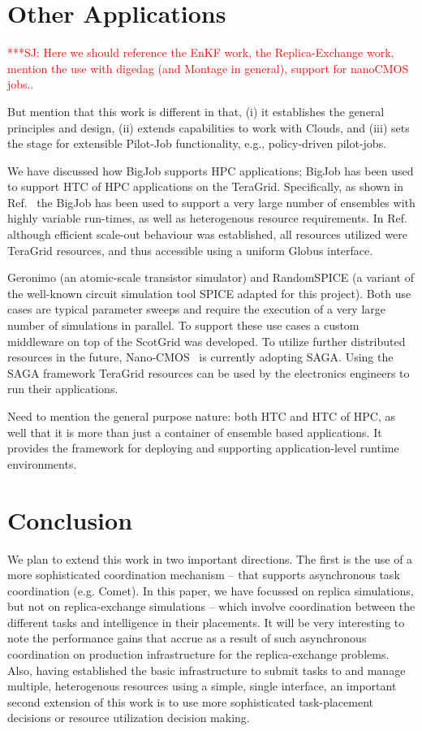 \documentclass[conference,final]{IEEEtran}
\newcommand{\jhanote}[1]{ {\textcolor{red} { ***SJ: #1 }}}
\newcommand{\jhanote}[1]{}
\begin{document}
\section{Other Applications}

\jhanote{Here we should reference the EnKF work, the Replica-Exchange
  work, mention the use with digedag (and Montage in general), support
  for nanoCMOS jobs..}

But mention that this work is different in that, (i) it establishes
the general principles and design, (ii) extends capabilities to work
with Clouds, and (iii) sets the stage for extensible Pilot-Job
functionality, e.g., policy-driven pilot-jobs.

We have discussed how BigJob supports HPC applications; BigJob has
been used to support HTC of HPC applications on the
TeraGrid. Specifically, as shown in Ref.~\cite{enkf-gmac09} the BigJob
has been used to support a very large number of ensembles with highly
variable run-times, as well as heterogenous resource requirements.  In
Ref.~\cite{enkf-gmac09} although efficient scale-out behaviour was
established, all resources utilized were TeraGrid resources, and thus
accessible using a uniform Globus interface. 


Geronimo (an atomic-scale transistor simulator) and RandomSPICE (a
variant of the well-known circuit simulation tool SPICE adapted for
this project). Both use cases are typical parameter sweeps and require
the execution of a very large number of simulations in parallel. To
support these use cases a custom middleware on top of the ScotGrid was
developed. To utilize further distributed resources in the future,
Nano-CMOS~\cite{nanocmos} is currently adopting SAGA. Using the SAGA
framework TeraGrid resources can be used by the electronics engineers
to run their applications.

Need to mention the general purpose nature: both HTC and HTC of HPC,
as well that it is more than just a container of ensemble based
applications.  It provides the framework for deploying and supporting
application-level runtime environments.

\section{Conclusion}

We plan to extend this work in two important directions. The first is
the use of a more sophisticated coordination mechanism -- that
supports asynchronous task coordination (e.g. Comet). In this paper,
we have focussed on replica simulations, but not on replica-exchange
simulations -- which involve coordination between the different tasks
and intelligence in their placements.  It will be very interesting to
note the performance gains that accrue as a result of such
asynchronous coordination on production infrastructure for the
replica-exchange problems. Also, having established the basic
infrastructure to submit tasks to and manage multiple, heterogenous
resources using a simple, single interface, an important second
extension of this work is to use more sophisticated task-placement
decisions or resource utilization decision making.
\end{document}
